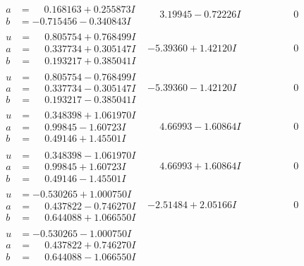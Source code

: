 \documentclass[1p]{elsarticle_modified}
\theoremstyle{definition}
\begin{document}
$$\begin{array}{c|c|c}
\begin{aligned}
a &= \phantom{-}0.168163 + 0.255873 I \\
b &= -0.715456 - 0.340843 I\end{aligned}
 & \phantom{-}3.19945 - 0.72226 I & \phantom{-0.000000 } 0 \\ \hline\begin{aligned}
u &= \phantom{-}0.805754 + 0.768499 I \\
a &= \phantom{-}0.337734 + 0.305147 I \\
b &= \phantom{-}0.193217 + 0.385041 I\end{aligned}
 & -5.39360 + 1.42120 I & \phantom{-0.000000 } 0 \\ \hline\begin{aligned}
u &= \phantom{-}0.805754 - 0.768499 I \\
a &= \phantom{-}0.337734 - 0.305147 I \\
b &= \phantom{-}0.193217 - 0.385041 I\end{aligned}
 & -5.39360 - 1.42120 I & \phantom{-0.000000 } 0 \\ \hline\begin{aligned}
u &= \phantom{-}0.348398 + 1.061970 I \\
a &= \phantom{-}0.99845 - 1.60723 I \\
b &= \phantom{-}0.49146 + 1.45501 I\end{aligned}
 & \phantom{-}4.66993 - 1.60864 I & \phantom{-0.000000 } 0 \\ \hline\begin{aligned}
u &= \phantom{-}0.348398 - 1.061970 I \\
a &= \phantom{-}0.99845 + 1.60723 I \\
b &= \phantom{-}0.49146 - 1.45501 I\end{aligned}
 & \phantom{-}4.66993 + 1.60864 I & \phantom{-0.000000 } 0 \\ \hline\begin{aligned}
u &= -0.530265 + 1.000750 I \\
a &= \phantom{-}0.437822 - 0.746270 I \\
b &= \phantom{-}0.644088 + 1.066550 I\end{aligned}
 & -2.51484 + 2.05166 I & \phantom{-0.000000 } 0 \\ \hline\begin{aligned}
u &= -0.530265 - 1.000750 I \\
a &= \phantom{-}0.437822 + 0.746270 I \\
b &= \phantom{-}0.644088 - 1.066550 I\end{aligned}

\end{array}$$
\end{document}
